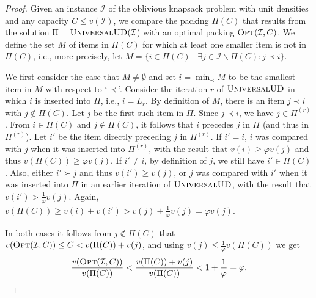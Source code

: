 \documentclass[11pt]{article}
\newcommand{\opt}{\textsc{Opt}}
\newcommand{\OPT}{\opt}
\newcommand{\I}{\mathcal{I}}
\begin{document}
\begin{proof}
Given an instance $\I$ of the oblivious knapsack problem with unit
densities and any capacity $C\leq v(\I)$, we compare the packing
$\Pi(C)$ that results from the solution $\Pi=\textsc{UniversalUD}(\I$)
with an optimal packing $\OPT(\I,C)$. We define the set $M$ of items
in $\Pi(C)$ for which at least one smaller item is not in $\Pi(C)$,
i.e., more precisely, let $M=\{i\in\Pi(C)\mid\exists j\in\I\backslash\Pi(C):j\prec i\}$.

We first consider the case that $M\neq\emptyset$ and set $i=\min_{\prec}M$
to be the smallest item in $M$ with respect to `$\prec$'. Consider
the iteration $r$ of $ $$\textsc{UniversalUD}$ in which $i$ is
inserted into $\Pi$, i.e., $i=L_{r}$. By definition of $M$, there
is an item $j\prec i$ with $j\notin\Pi(C).$ Let $j$ be the first
such item in $\Pi$. Since $j\prec i$, we have $j\in\Pi^{(r)}$.
From $i\in\Pi(C)$ and $j\notin\Pi(C)$, it follows that $i$ precedes
$j$ in $\Pi$ (and thus in $\Pi^{(r)}$). Let $i'$ be the item directly
preceding $j$ in $\Pi^{(r)}$. If $i'=i$, $i$ was compared with
$j$ when it was inserted into $\Pi^{(r)}$, with the result that
$v(i)\geq\varphi v(j)$ and thus $v(\Pi(C))\geq\varphi v(j)$. If
$i'\neq i$, by definition of $j$, we still have $i'\in\Pi(C)$.
Also, either $i'\succ j$ and thus $v(i')\geq v(j)$, or $j$ was
compared with $i'$ when it was inserted into $\Pi$ in an earlier
iteration of $\textsc{UniversalUD}$, with the result that $v(i')>\frac{1}{\varphi}v(j)$.
Again, $v(\Pi(C))\geq v(i)+v(i')>v(j)+\frac{1}{\varphi}v(j)=\varphi v(j)$.

In both cases it follows from $j\notin\Pi(C)$ that $v(\OPT(\I,C))\leq C<v(\Pi(C))+v(j)$,
and using $v(j)\leq\frac{1}{\varphi}v(\Pi(C))$ we get 
\[
\frac{v(\OPT(\I,C))}{v(\Pi(C))}<\frac{v(\Pi(C))+v(j)}{v(\Pi(C))}<1+\frac{1}{\varphi}=\varphi.
\]



\end{proof}
\end{document}
